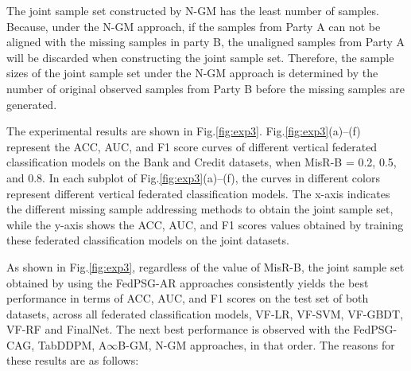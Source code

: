 \documentclass[final,1p,times]{elsarticle}
\begin{document}
 The joint sample set constructed by N-GM has the least number of samples. Because, under the N-GM approach, if the samples from Party A can not be aligned with the missing samples in party B, the unaligned samples from Party A will be discarded when constructing the joint sample set. Therefore, the sample sizes of the joint sample set under the N-GM approach is determined by the number of original observed samples from Party B before the missing samples are generated.

The experimental results are shown in Fig.\ref{fig:exp3}. Fig.\ref{fig:exp3}(a)–(f) represent the ACC, AUC, and F1 score curves of different vertical federated classification models on the Bank and Credit datasets, when MisR-B = 0.2, 0.5, and 0.8. In each subplot of Fig.\ref{fig:exp3}(a)–(f), the curves in different colors represent different vertical federated classification models. The x-axis indicates the different missing sample addressing methods to obtain the joint sample set, while the y-axis shows the ACC, AUC, and F1 scores values obtained by training these federated classification models on the joint datasets.

As shown in Fig.\ref{fig:exp3}, regardless of the value of MisR-B, the joint sample set obtained by using the FedPSG-AR approaches consistently yields the best performance in terms of ACC, AUC, and F1 scores on the test set of both datasets, across all federated classification models, VF-LR, VF-SVM, VF-GBDT, VF-RF and FinalNet. The next best performance is observed with the FedPSG-CAG, TabDDPM, A$\infty$B-GM, N-GM approaches, in that order. The reasons for these results are as follows:
\end{document}
